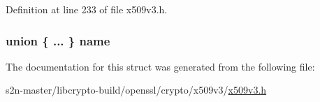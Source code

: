 Definition at line 233 of file x509v3.\+h.

\subsubsection[{\texorpdfstring{name}{name}}]{\setlength{\rightskip}{0pt plus 5cm}union \{ ... \}   name}\hypertarget{struct_d_i_s_t___p_o_i_n_t___n_a_m_e__st_a274eb3f487586aa165253cab11cad834}{}\label{struct_d_i_s_t___p_o_i_n_t___n_a_m_e__st_a274eb3f487586aa165253cab11cad834}


The documentation for this struct was generated from the following file\+:\begin{DoxyCompactItemize}
\item 
s2n-\/master/libcrypto-\/build/openssl/crypto/x509v3/\hyperlink{crypto_2x509v3_2x509v3_8h}{x509v3.\+h}\end{DoxyCompactItemize}
